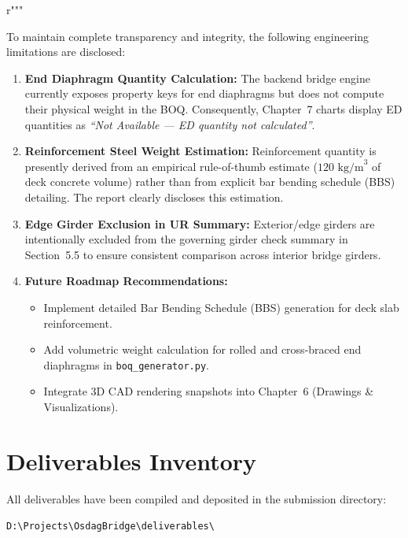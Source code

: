 r"""\documentclass[11pt,a4paper]{article}
\begin{document}
To maintain complete transparency and integrity, the following engineering limitations are disclosed:
\begin{enumerate}
    \item \textbf{End Diaphragm Quantity Calculation:} The backend bridge engine currently exposes property keys for end diaphragms but does not compute their physical weight in the BOQ. Consequently, Chapter~7 charts display ED quantities as \textit{``Not Available --- ED quantity not calculated''}.
    \item \textbf{Reinforcement Steel Weight Estimation:} Reinforcement quantity is presently derived from an empirical rule-of-thumb estimate ($120\text{ kg/m}^3$ of deck concrete volume) rather than from explicit bar bending schedule (BBS) detailing. The report clearly discloses this estimation.
    \item \textbf{Edge Girder Exclusion in UR Summary:} Exterior/edge girders are intentionally excluded from the governing girder check summary in Section~5.5 to ensure consistent comparison across interior bridge girders.
    \item \textbf{Future Roadmap Recommendations:}
    \begin{itemize}
        \item Implement detailed Bar Bending Schedule (BBS) generation for deck slab reinforcement.
        \item Add volumetric weight calculation for rolled and cross-braced end diaphragms in \texttt{boq\_generator.py}.
        \item Integrate 3D CAD rendering snapshots into Chapter~6 (Drawings \& Visualizations).
    \end{itemize}
\end{enumerate}

\section{Deliverables Inventory}

All deliverables have been compiled and deposited in the submission directory:
\begin{center}
\texttt{D:\textbackslash Projects\textbackslash OsdagBridge\textbackslash deliverables\textbackslash}
\end{center}
\end{document}
